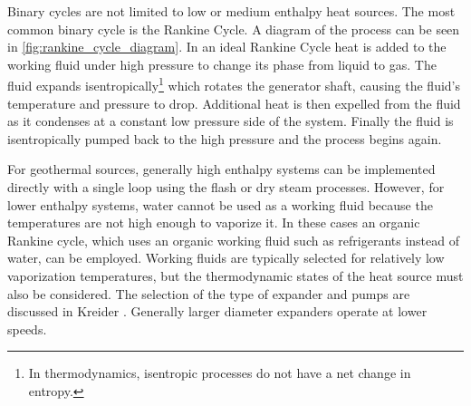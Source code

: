 Binary cycles are not limited to low or medium enthalpy heat sources. The most common binary cycle is the Rankine Cycle. A diagram of the process can be seen in \autoref{fig:rankine_cycle_diagram}. In an ideal Rankine Cycle heat is added to the working fluid under high pressure to change its phase from liquid to gas. The fluid expands isentropically\footnote{In thermodynamics, isentropic processes do not have a net change in entropy.} which rotates the generator shaft, causing the fluid's temperature and pressure to drop. Additional heat is then expelled from the fluid as it condenses at a constant low pressure side of the system. Finally the fluid is isentropically pumped back to the high pressure and the process begins again.


For geothermal sources, generally high enthalpy systems can be implemented directly with a single loop using the flash or dry steam processes. However, for lower enthalpy systems, water cannot be used as a working fluid because the temperatures are not high enough to vaporize it. In these cases an organic Rankine cycle, which uses an organic working fluid such as refrigerants instead of water, can be employed. Working fluids are typically selected for relatively low vaporization temperatures, but the thermodynamic states of the heat source must also be considered. The selection of the type of expander and pumps are discussed in Kreider \cite{Kreider}. Generally larger diameter expanders operate at lower speeds.





